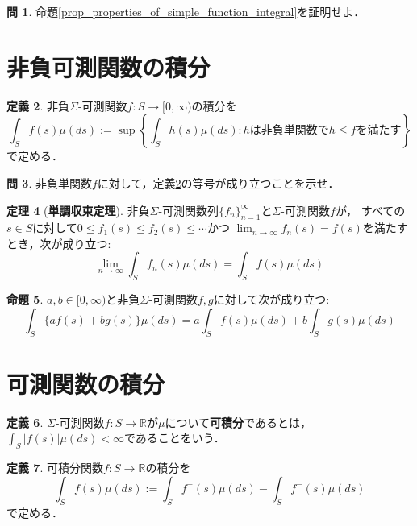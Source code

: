 \documentclass{jsreport}
\theoremstyle{definition}
\newtheorem{defi}{定義}[section]
\newtheorem{prop}[defi]{命題}
\newtheorem{thm}[defi]{定理}
\newtheorem{qst}[defi]{問}
\begin{document}
\begin{qst}\label{qst_proof_of_properties_of_simple_function_integral}
命題\ref{prop_properties_of_simple_function_integral}を証明せよ．
\end{qst}

\section{非負可測関数の積分}

\begin{defi}\label{def_nonnegative_function_integral}
非負$\Sigma$-可測関数$f \colon S\to\mathbb[0,\infty)$の積分を
\[ \int_S f(s)\mu(ds):=\sup\left\{\int_Sh(s)\mu(ds):hは非負単関数でh \leq fを満たす\right\} \]
で定める．
\end{defi}

\begin{qst}\label{qst_nonnegative_function_integral_and_simple_function}
非負単関数$f$に対して，定義\ref{def_nonnegative_function_integral}の等号が成り立つことを示せ．
\end{qst}

\begin{thm}[\textbf{単調収束定理}]\label{monotone_convergence_theorem}
非負$\Sigma$-可測関数列$\{f_n\}_{n=1}^\infty$と$\Sigma$-可測関数$f$が，
すべての$s \in S$に対して$0 \leq f_1(s) \leq f_2(s) \leq\cdots$かつ
$\displaystyle\lim_{n\to\infty}f_n(s)=f(s)$を満たすとき，次が成り立つ:
\[ \lim_{n\to\infty}\int_S f_n(s)\mu(ds)=\int_S f(s)\mu(ds) \]
\end{thm}

\begin{prop}\label{prop_linearity_of_nonnegative_function_integral}
$a,b\in[0,\infty)$と非負$\Sigma$-可測関数$f,g$に対して次が成り立つ:
\[ \int_S\{af(s)+bg(s)\}\mu(ds)=a\int_Sf(s)\mu(ds)+b\int_Sg(s)\mu(ds) \]
\end{prop}

\section{可測関数の積分}

\begin{defi}\label{def_integrable_function}
$\Sigma$-可測関数$f \colon S\to\mathbb{R}$が$\mu$について\textbf{可積分}であるとは，
$\displaystyle\int_S|f(s)|\mu(ds)<\infty$であることをいう．

\end{defi}

\begin{defi}\label{def_measurable_function_integral}
可積分関数$f \colon S\to\mathbb{R}$の積分を
\[ \int_S f(s)\mu(ds):=\int_S f^+(s)\mu(ds)-\int_S f^-(s)\mu(ds)  \]
で定める．
\end{defi}
\end{document}
